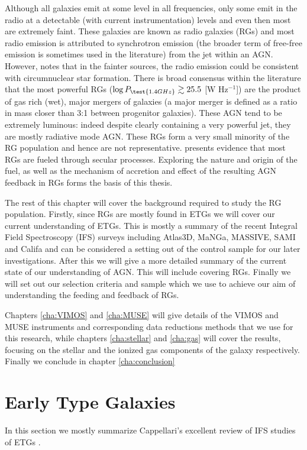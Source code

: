 Although all galaxies emit at some level in all frequencies, only some emit in the radio at a detectable (with current instrumentation) levels and even then most are extremely faint. These galaxies are known as radio galaxies (RGs) and most radio emission is attributed to synchrotron emission (the broader term of free-free emission is sometimes used in the literature) from the jet within an AGN. However, \citet{Nyland2016} notes that in the fainter sources, the radio emission could be consistent with circumnuclear star formation. There is broad consensus within the literature that the most powerful RGs ($\log P_\test{1.4 GHz} \gtrsim 25.5$ [W Hz$^{-1}$]) are the product of gas rich (wet), major mergers of galaxies (a major merger is defined as a ratio in mass closer than 3:1 between progenitor galaxies). These AGN tend to be extremely luminous: indeed despite clearly containing a very powerful jet, they are mostly radiative mode AGN. These RGs form a very small minority of the RG population and hence are not representative. \citet{Heckman2014} presents evidence that most RGs are fueled through secular processes. Exploring the nature and origin of the fuel, as well as the mechanism of accretion and effect of the resulting AGN feedback in RGs forms the basis of this thesis. 

The rest of this chapter will cover the background required to study the RG population. Firstly, since RGs are mostly found in ETGs we will cover our current understanding of ETGs. This is mostly a summary of the recent Integral Field Spectroscopy (IFS) surveys including Atlas3D, MaNGa, MASSIVE, SAMI and Califa and can be considered a setting out of the control sample for our later investigations. After this we will give a more detailed summary of the current state of our understanding of AGN. This will include covering RGs. Finally we will set out our selection criteria and sample which we use to achieve our aim of understanding the feeding and feedback of RGs.

Chapters \ref{cha:VIMOS} and \ref{cha:MUSE} will give details of the VIMOS and MUSE instruments and corresponding data reductions methods that we use for this research, while chapters \ref{cha:stellar} and \ref{cha:gas} will cover the results, focusing on the stellar and the ionized gas components of the galaxy respectively. Finally we conclude in chapter \ref{cha:conclusion}

\section{Early Type Galaxies}
	\label{sec:ETG}
	In this section we mostly summarize Cappellari's excellent review of IFS studies of ETGs \citep{Cappellari2016}. 

